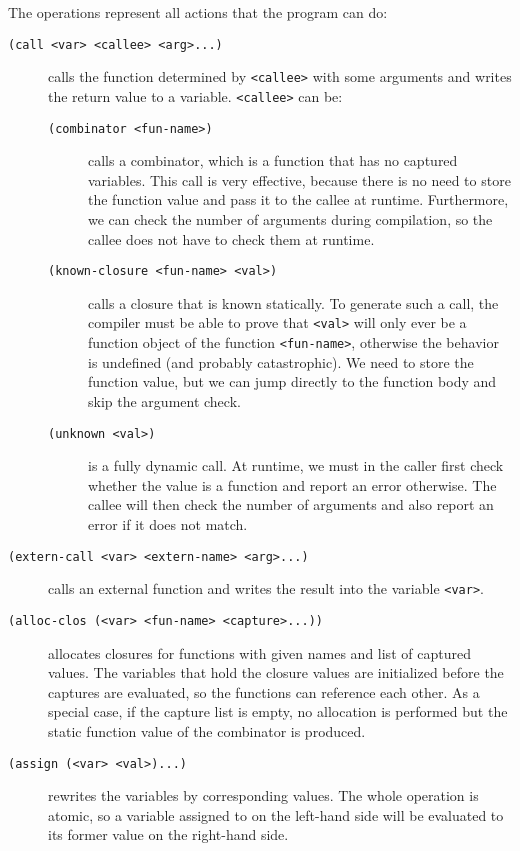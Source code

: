 The operations represent all actions that the program can do:

\begin{description}
  \item[\texttt{(call <var> <callee> <arg>...)}] calls the function determined
    by \texttt{<callee>} with some arguments and writes the return value to a
    variable. \texttt{<callee>} can be:
    \begin{description}
      \item[\texttt{(combinator <fun-name>)}] calls a combinator, which is a
        function that has no captured variables. This call is very effective,
        because there is no need to store the function value and pass it to the
        callee at runtime. Furthermore, we can check the number of arguments
        during compilation, so the callee does not have to check them at
        runtime.
      \item[\texttt{(known-closure <fun-name> <val>)}] calls a closure that is
        known statically. To generate such a call, the compiler must be able to
        prove that \texttt{<val>} will only ever be a function object of the
        function \texttt{<fun-name>}, otherwise the behavior is undefined (and
        probably catastrophic). We need to store the function value, but we can
        jump directly to the function body and skip the argument check.
      \item[\texttt{(unknown <val>)}] is a fully dynamic call. At runtime, we
        must in the caller first check whether the value is a function and
        report an error otherwise. The callee will then check the number of
        arguments and also report an error if it does not match.
    \end{description}

  \item[\texttt{(extern-call <var> <extern-name> <arg>...)}] calls an external
    function and writes the result into the variable \texttt{<var>}.

  \item[\texttt{(alloc-clos (<var> <fun-name> <capture>...))}] allocates
    closures for functions with given names and list of captured values. The
    variables that hold the closure values are initialized before the captures
    are evaluated, so the functions can reference each other. As a special case,
    if the capture list is empty, no allocation is performed but the static
    function value of the combinator is produced.

  \item[\texttt{(assign (<var> <val>)...)}] rewrites the variables by
    corresponding values. The whole operation is atomic, so a variable assigned
    to on the left-hand side will be evaluated to its former value on the
    right-hand side.
\end{description}

